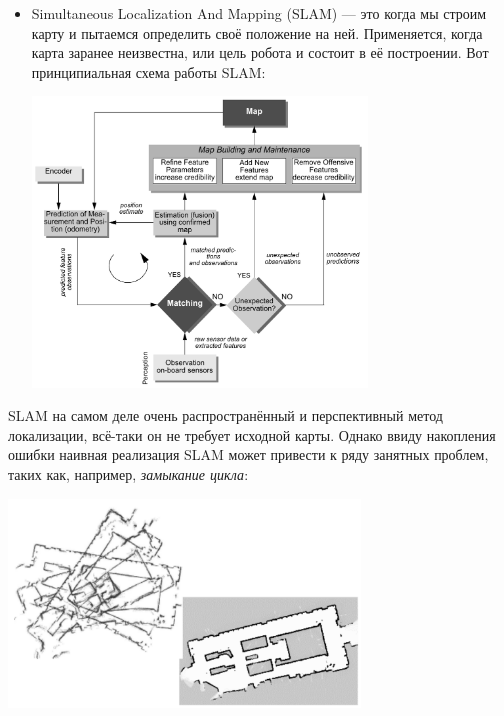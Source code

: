 \documentclass{../../text-style}
\begin{document}
\begin{itemize}
\begin{itemize}
\begin{center}
            \end{center}
    \end{itemize}
    \item Simultaneous Localization And Mapping (SLAM) --- это когда мы строим карту и пытаемся определить своё положение на ней.
        Применяется, когда карта заранее неизвестна, или цель робота и состоит в её построении.
        Вот принципиальная схема работы SLAM:
        \begin{center}
            \includegraphics[width=0.7\textwidth]{slam.png}
        \end{center}
\end{itemize}

SLAM на самом деле очень распространённый и перспективный метод локализации, всё-таки он не требует исходной карты.
Однако ввиду накопления ошибки наивная реализация SLAM может привести к ряду занятных проблем, таких как, например, \emph{замыкание цикла}:

\begin{center}
    \includegraphics[width=0.7\textwidth]{slamErrors.png}
\end{center}
\end{document}
